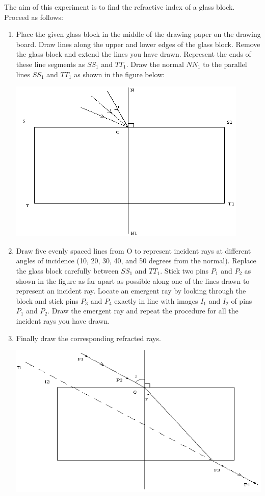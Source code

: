 The aim of this experiment is to find the refractive index of a glass block. Proceed
as follows:
\begin{enumerate}
\item{Place the given glass block in the middle of the drawing paper on the drawing
board. Draw lines along the upper and lower edges of the glass block. Remove the
glass block and extend the lines you have drawn. Represent the ends of these line
segments as $SS_1$ and $TT_1$. Draw the normal $NN_1$ to the parallel lines $SS_1$ and
$TT_1$ as shown in the figure below:

\begin{center}
\includegraphics{./img/light-block-1.png}
\end{center}

}%

\item{Draw five evenly spaced lines from O to represent incident rays at different
angles of incidence (10, 20, 30, 40, and 50 degrees from the normal). Replace the
glass block carefully between $SS_1$ and $TT_1$. Stick two pins $P_1$ and $P_2$ as shown in
the figure as far apart as possible along one of the lines drawn to represent an
incident ray. Locate an emergent ray by looking through the block and stick pins
$P_3$ and $P_4$ exactly in line with images $I_1$ and $I_2$ of pins $P_1$ and $P_2$. Draw the
emergent ray and repeat the procedure for all the incident rays you have drawn.}
\item{Finally draw the corresponding refracted rays.}

\begin{center}
\includegraphics{./img/light-block-2.png}
\end{center}


\end{enumerate}
